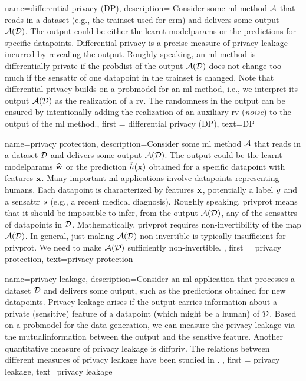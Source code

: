 {name=differential privacy (DP),
  description={
  	Consider some \gls{ml} method $\mathcal{A}$ that reads in a \gls{dataset} (e.g., the \gls{trainset} 
  	used for \gls{erm}) and delivers some output $\mathcal{A}(\mathcal{D})$. The output 
  	could be either the learnt \gls{modelparams} or the \gls{prediction}s for specific \gls{datapoint}s. 
  	Differential privacy is a precise measure of privacy leakage incurred by revealing the 
  	output. Roughly speaking, an \gls{ml} method is differentially private if the \gls{probdist} 
  	of the output $\mathcal{A}(\mathcal{D})$ does not change too much if the \gls{sensattr} 
  	of one \gls{datapoint} in the \gls{trainset} is changed. Note that differential privacy 
  	builds on a \gls{probmodel} for an \gls{ml} method, i.e., we interpret its output $\mathcal{A}(\mathcal{D})$ 
  	as the \gls{realization} of a \gls{rv}. The randomness in the output can be ensured 
  	by intentionally adding the \gls{realization} of an auxiliary \gls{rv} (\emph{noise}) to 
  	the output of the \gls{ml} method.}, 
	first = {differential privacy (DP)}, text={DP} 
}

{name=privacy protection,
     description={Consider some \gls{ml} method $\mathcal{A}$ that reads 
	 in a \gls{dataset} $\mathcal{D}$ and delivers some output $\mathcal{A}(\mathcal{D})$. The output 
	 could be the learnt \gls{modelparams} $\widehat{{\bf w}}$ or the \gls{prediction} 
	 $\hat{h}({\bf x})$ obtained for a specific \gls{datapoint} with \gls{feature}s 
	 ${\bf x}$. Many important \gls{ml} applications involve \gls{datapoint}s 
		representing humans. Each \gls{datapoint} is characterized by \gls{feature}s ${\bf x}$, 
		potentially a \gls{label} $y$ and a \gls{sensattr} $s$ (e.g., a recent medical diagnosis). 
		Roughly speaking, \gls{privprot} means that it should be impossible to infer, from the output $\mathcal{A}(\mathcal{D})$, 
		any of the \gls{sensattr}s of \gls{datapoint}s in $\mathcal{D}$. Mathematically, \gls{privprot} requires non-invertibility 
		of the map $\mathcal{A}(\mathcal{D})$. In general, just making $\mathcal{A}(\mathcal{D})$ non-invertible 
		is typically insufficient for \gls{privprot}. We need to make $\mathcal{A}(\mathcal{D})$ sufficiently non-invertible. 
	}, 
	first = {privacy protection}, text={privacy protection} 
}

{
	name=privacy leakage,
	description={Consider an \gls{ml} application that processes a 
	\gls{dataset} $\mathcal{D}$ and delivers some output, such as the predictions 
	obtained for new \gls{datapoint}s. Privacy leakage arises 
	if the output carries information about a private (sensitive) \gls{feature} of 
	a \gls{datapoint} (which might be a human) of $\mathcal{D}$. Based on a \gls{probmodel} 
	for the data generation, we can measure the privacy leakage via the \gls{mutualinformation} 
	between the output and the senstive \gls{feature}. Another quantitative measure of privacy leakage 
	is \gls{diffpriv}. The relations between different measures of privacy leakage have been 
	studied in \cite{InfThDiffPriv}. 
	}, 
	first = {privacy leakage}, text={privacy leakage} 
}



